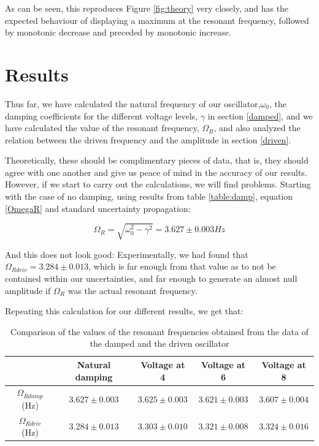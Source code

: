 \documentclass[a4paper,12pt]{article}
\begin{document}
As can be seen, this reproduces Figure \ref{fig:theory} very closely, and has the expected behaviour of displaying a maximum at the resonant frequency, followed by monotonic decrease and preceded by monotonic increase. 
%
\section{Results}

Thus far, we have calculated the natural frequency of our oscillator,$\omega_0$, the damping coefficients for the different voltage levels, $\gamma$ in section \ref{damped}, and we have calculated the value of the resonant frequency, $\Omega_R$, and also analyzed the relation between the driven frequency and the amplitude in section \ref{driven}.

Theoretically, these should be complimentary pieces of data, that is, they should agree with one another and give us peace of mind in the accuracy of our results. However, if we start to carry out the calculations, we will find problems. Starting with the case of no damping, using results from table \ref{table:damp}, equation \ref{OmegaR} and standard uncertainty propagation:

\begin{equation*}
    \Omega_{R} = \sqrt{\omega_0^2-\gamma^2} = 3.627 \pm 0.003 Hz
\end{equation*}

And this does not look good: Experimentally, we had found that $\Omega_{Rdriv} = 3.284 \pm 0.013$, which is far enough from that value as to not be contained within our uncertainties, and far enough to generate an almost null amplitude if $\Omega_{R}$ was the actual resonant frequency. 

Repeating this calculation for our different results, we get that:

\begin{table}[]
    \caption{Comparison of the values of the resonant frequencies obtained from the data of the damped and the driven oscillator}
    \centering
    \begin{tabular}{|c|c|c|c|c|}
    &Natural damping &  Voltage at 4 & Voltage at 6 & Voltage at 8\\
        \hline
        $\Omega_{Rdamp}$ (Hz)& $3.627 \pm 0.003$  &$3.625\pm 0.003$ & $3.621\pm 0.003$ & $3.607\pm 0.004$  \\
        $\Omega_{Rdriv}$ (Hz)& $3.284 \pm 0.013$ &$3.303 \pm 0.010$ & $3.321 \pm 0.008$ & $3.324\pm 0.016$
    \end{tabular}
    
    \label{tab:my_label}
\end{table}
\end{document}
